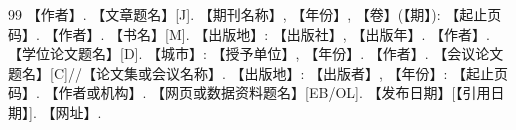 %

\begin{thebibliography}{99}
   【作者】. 【文章题名】[J]. 【期刊名称】, 【年份】, 【卷】(【期】): 【起止页码】.
   【作者】. 【书名】[M]. 【出版地】: 【出版社】, 【出版年】.
   【作者】. 【学位论文题名】[D]. 【城市】: 【授予单位】, 【年份】.
   【作者】. 【会议论文题名】[C]//【论文集或会议名称】. 【出版地】: 【出版者】, 【年份】: 【起止页码】.
   【作者或机构】. 【网页或数据资料题名】[EB/OL]. 【发布日期】[【引用日期】]. 【网址】.
\end{thebibliography}
